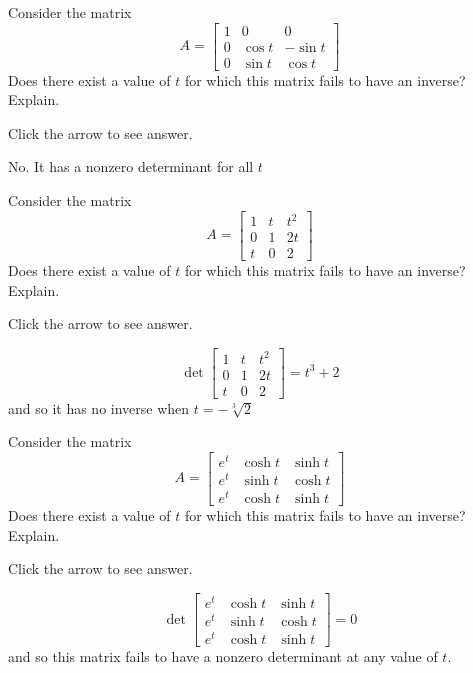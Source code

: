 \documentclass{ximera}
\begin{document}
\begin{problem}\label{prb:7.32} Consider the matrix
\begin{equation*}
A =
\left[
\begin{array}{ccc}
1 & 0 & 0 \\
0 & \cos t & -\sin t \\
0 & \sin t & \cos t
\end{array}
\right]
\end{equation*}
Does there exist a value of $t$ for which this matrix fails to have an
inverse? Explain.

Click the arrow to see answer.
\begin{expandable}
 No. It has a nonzero determinant for all $t$
\end{expandable}
\end{problem}


\begin{problem}\label{prb:7.33} Consider the matrix
\begin{equation*}
A =
\left[
\begin{array}{rrr}
1 & t & t^{2} \\
0 & 1 & 2t \\
t & 0 & 2
\end{array}
\right]
\end{equation*}
Does there exist a value of $t$ for which this matrix fails to have an
inverse? Explain.

Click the arrow to see answer.
\begin{expandable}
\[
\det \left[
\begin{array}{ccc}
1 & t & t^{2} \\
0 & 1 & 2t \\
t & 0 & 2
\end{array}
\right] = t^{3}+2
\]
and so it has no inverse when $t=-\sqrt[3]{2}$
\end{expandable}
\end{problem}

\begin{problem}\label{prb:7.34} Consider the matrix
\begin{equation*}
A =
\left[
\begin{array}{ccc}
e^{t} & \cosh t & \sinh t \\
e^{t} & \sinh t & \cosh t \\
e^{t} & \cosh t & \sinh t
\end{array}
\right]
\end{equation*}
Does there exist a value of $t$ for which this matrix fails to have an
inverse? Explain.

Click the arrow to see answer.
\begin{expandable}
\[
\det \left[
\begin{array}{ccc}
e^{t} & \cosh t & \sinh t \\
e^{t} & \sinh t & \cosh t \\
e^{t} & \cosh t & \sinh t
\end{array}
\right] = 0
\]
and so this matrix fails to have a nonzero determinant at any value of $t$.
\end{expandable}
\end{problem}
\end{document}
